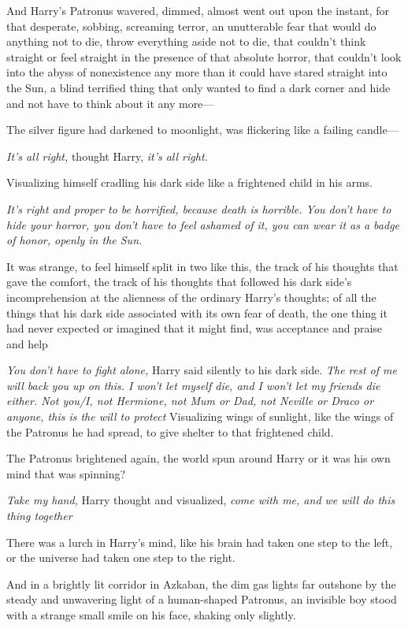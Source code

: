 And Harry's Patronus wavered, dimmed, almost went out upon the instant, for
that desperate, sobbing, screaming terror, an unutterable fear that would do
anything not to die, throw everything aside not to die, that couldn't think
straight or feel straight in the presence of that absolute horror, that
couldn't look into the abyss of nonexistence any more than it could have stared
straight into the Sun, a blind terrified thing that only wanted to find a dark
corner and hide and not have to think about it any more—

The silver figure had darkened to moonlight, was flickering like a failing
candle—

\emph{It's all right,} thought Harry, \emph{it's all right.}

Visualizing himself cradling his dark side like a frightened child in his arms.

\emph{It's right and proper to be horrified, because death is horrible. You
don't have to hide your horror, you don't have to feel ashamed of it, you can
wear it as a badge of honor, openly in the Sun.}

It was strange, to feel himself split in two like this, the track of his
thoughts that gave the comfort, the track of his thoughts that followed his
dark side's incomprehension at the alienness of the ordinary Harry's thoughts;
of all the things that his dark side associated with its own fear of death, the
one thing it had never expected or imagined that it might find, was acceptance
and praise and help{\el}

\emph{You don't have to fight alone,} Harry said silently to his dark side.
\emph{The rest of me will back you up on this. I won't let myself die, and I
won't let my friends die either. Not you/I, not Hermione, not Mum or Dad, not
Neville or Draco or anyone, this is the will to protect{\el}} Visualizing
wings of sunlight, like the wings of the Patronus he had spread, to give
shelter to that frightened child.

The Patronus brightened again, the world spun around Harry or it was his own
mind that was spinning?

\emph{Take my hand,} Harry thought and visualized, \emph{come with me, and we
will do this thing together{\el}\\
}

There was a lurch in Harry's mind, like his brain had taken one step to the
left, or the universe had taken one step to the right.

And in a brightly lit corridor in Azkaban, the dim gas lights far outshone by
the steady and unwavering light of a human-shaped Patronus, an invisible boy
stood with a strange small smile on his face, shaking only slightly.

